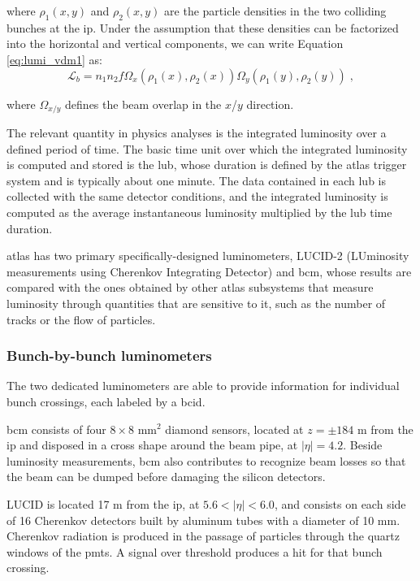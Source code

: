 \noindent where $\rho_1(x,y)$ and $\rho_2(x,y)$ are the particle densities in the two colliding bunches at the \gls{ip}. 
Under the assumption that these densities can be factorized into the horizontal and vertical components, we can write Equation \ref{eq:lumi_vdm1} as:
\begin{equation}
\mathcal{L}_b = n_1 n_2 f  \Omega_x(\rho_1(x), \rho_2(x)) \Omega_y(\rho_1(y), \rho_2(y))  \; , \nonumber
\label{eq:lumi_vdm2}
\end{equation}

\noindent where $\Omega_{x/y}$ defines the beam overlap in the $x$/$y$ direction.

The relevant quantity in physics analyses is the integrated luminosity over a defined period of time. The basic time unit over which the integrated luminosity is computed and stored is the \gls{lub}, whose duration is defined by the \gls{atlas} trigger system and is typically about one minute. The data contained in each \gls{lub} is collected with the same detector conditions, and the integrated luminosity is computed as the average instantaneous luminosity multiplied by the \gls{lub} time duration.

\gls{atlas} has two primary specifically-designed luminometers, LUCID-2 (LUminosity measurements using Cherenkov Integrating Detector) and \gls{bcm}, whose results are compared with the ones obtained by other \gls{atlas} subsystems that measure luminosity through quantities that are sensitive to it, such as the number of tracks or the flow of particles.

\subsubsection*{Bunch-by-bunch luminometers}

The two dedicated luminometers are able to provide information for individual bunch crossings, each labeled by a \gls{bcid}.

\gls{bcm} consists of four $8 \times 8$ mm$^2$ diamond sensors, located at $z= \pm 184$ m from the \gls{ip} and disposed in a cross shape around the beam pipe, at $|\eta| = 4.2$. Beside luminosity measurements, \gls{bcm} also contributes to recognize beam losses so that the beam can be dumped before damaging the silicon detectors. 

LUCID is located 17 m from the \gls{ip}, at $5.6 < |\eta| < 6.0$, and consists on each side of 16 Cherenkov detectors built by aluminum tubes with a diameter of 10 mm. Cherenkov radiation is produced in the passage of particles through the quartz windows of the \glspl{pmt}. A signal over threshold produces a hit for that bunch crossing.

